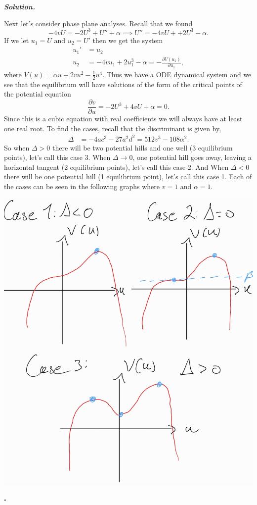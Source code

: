 \documentclass[12pt]{report}
\newenvironment{solution}[1][\it{Solution}]{\textbf{#1. } }{$\square$}
\def\half{\frac{1}{2}}
\newcommand{\pp}[2]{\frac{\partial #1}{\partial #2}} %
\begin{document}
\begin{solution}
\begin{enumerate}
        \noindent
        Next let's consider phase plane analyses. Recall that we found
        \[ 
            -4vU = -2U^3 + U'' + \alpha \implies U'' = -4vU + + 2U^3 - \alpha.
        \]
        If we let $u_1 = U$ and $u_2 = U'$ then we get the system
        \begin{align*}
            u_1' &= u_2\\
            u_2 &= -4vu_1 + 2u_1^3 - \alpha = -\pp{V(u_1)}{u_1},
        \end{align*}
        where $V(u) = \alpha u + 2vu^2 - \half u^4$. Thus we have a ODE dynamical system and we see that the equilibrium will have solutions of the form of the critical points of the potential equation
        \[ 
            \pp{v}{u} = -2U^3 + 4vU + \alpha = 0.
        \]
        Since this is a cubic equation with real coefficients we will always have at least one real root. To find the cases, recall that the discriminant is given by,
        \begin{align*}
            \Delta &= -4ac^3 - 27a^2d^2 = 512v^3 - 108\alpha^2.
        \end{align*}
        So when $\Delta > 0$ there will be two potential hills and one well (3 equilibrium points), let's call this case 3. When $\Delta \to 0$, one potential hill goes away, leaving a horizontal tangent (2 equilibrium points), let's call this case 2. And When $\Delta < 0$ there will be one potential hill (1 equilibrium point), let's call this case 1. Each of the cases can be seen in the following graphs where $v=1$ and $\alpha =1$.   
        \begin{center}
            \includegraphics[width=.6\textwidth]{plots/4b-situations.jpg}
        \end{center}


\end{enumerate}
\end{solution}
\end{document}
